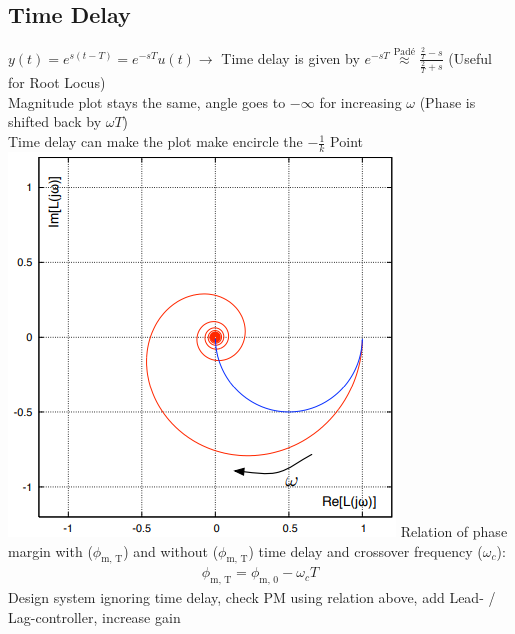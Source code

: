 \subsection{Time Delay}
    $y(t) = e^{s(t-T)} = e^{-sT} u(t) \rightarrow$ Time delay is given by $e^{-sT} \overset{\text{Padé}}{\approx} \frac{\frac{2}{T} - s}{\frac{2}{T} + s}$ (Useful for Root Locus)\\
    Magnitude plot stays the same, angle goes to $-\infty$ for increasing $\omega$ (Phase is shifted back by $\omega T$)\\
    Time delay can make the plot make encircle the $-\frac{1}{k}$ Point
    \includegraphics[width = \linewidth]{src/images/time_delay_nyquist.png}
    Relation of phase margin with ($\phi_{\text{m, T}}$) and without ($\phi_{\text{m, T}}$) time delay and crossover frequency ($\omega_c$):
    \begin{align*}
        \phi_{\text{m, T}} = \phi_{\text{m, 0}} - \omega_c T
    \end{align*}
    Design system ignoring time delay, check PM using relation above, add Lead- / Lag-controller, increase gain